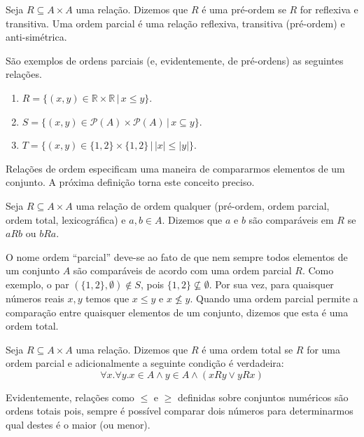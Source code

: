 \begin{Definition}
Seja $R \subseteq A \times A$ uma relação. Dizemos que $R$ é uma
pré-ordem se $R$ for reflexiva e transitiva. Uma ordem parcial é uma
relação reflexiva, transitiva (pré-ordem) e anti-simétrica.
\end{Definition}

\begin{Example}
São exemplos de ordens parciais (e, evidentemente, de pré-ordens) as
seguintes relações.
\begin{enumerate}
  \item $R =\{(x,y)\in\mathbb{R}\times\mathbb{R}\,|\,x \leq y\}$.
  \item $S = \{(x,y)\in\mathcal{P}(A)\times\mathcal{P}(A)\,|\,x
    \subseteq y\}$.
  \item $T = \{(x,y)\in\{1,2\}\times\{1,2\}\,|\,|x| \leq |y|\}$.
\end{enumerate}
\end{Example}

Relações de ordem especificam uma maneira de compararmos elementos de
um conjunto. A próxima definição torna este conceito preciso.
\begin{Definition}
Seja $R \subseteq A \times A$ uma relação de ordem qualquer
(pré-ordem, ordem parcial, ordem total, lexicográfica) e $a,b \in
A$. Dizemos que $a$ e $b$ são comparáveis em $R$ se $aRb$ ou $bRa$.
\end{Definition}

O nome ordem ``parcial'' deve-se ao fato de que nem sempre todos
elementos de um conjunto $A$ são comparáveis de acordo com uma ordem
parcial $R$. Como exemplo, o par $(\{1,2\},\emptyset) \not\in S$, pois
$\{1,2\}\not\subseteq \emptyset$. Por sua vez, para quaisquer números
reais $x,y$ temos que $x \leq y$ e $x \not\leq y$. Quando uma ordem
parcial permite a comparação entre quaisquer elementos de um conjunto,
dizemos que esta é uma ordem total.
\begin{Definition}
Seja $R \subseteq A \times A$ uma relação. Dizemos que $R$ é uma ordem
total se $R$ for uma ordem parcial e adicionalmente a seguinte
condição é verdadeira:
\[
\forall x. \forall y. x\in A \land y \in A \land (xRy \lor yRx)
\]
\end{Definition}

Evidentemente, relações como $\leq$ e $\geq$ definidas sobre conjuntos
numéricos são ordens totais pois, sempre é possível comparar dois
números para determinarmos qual destes é o maior (ou menor).

